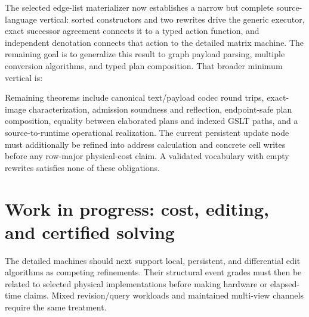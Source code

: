 \documentclass[11pt]{article}
\theoremstyle{remark}
\begin{document}
The selected edge-list materializer now establishes a narrow but complete
source-language vertical: sorted constructors and two rewrites drive the
generic executor, exact successor agreement connects it to a typed action
function, and independent denotation connects that action to the detailed
matrix machine.  The remaining goal is to generalize this result to graph
payload parsing, multiple conversion algorithms, and typed plan composition.
That broader minimum vertical is:
\begin{center}
\end{center}
Remaining theorems include canonical text/payload codec round trips,
exact-image characterization, admission soundness and reflection,
endpoint-safe plan composition, equality between elaborated plans and indexed
GSLT paths, and a source-to-runtime operational realization.  The current
persistent update node must additionally be refined into address calculation
and concrete cell writes before any row-major physical-cost claim.  A
validated vocabulary with empty rewrites satisfies none of these obligations.

\section{Work in progress: cost, editing, and certified solving}
\label{app:later}

The detailed machines should next support local, persistent, and differential
edit algorithms as competing refinements.  Their structural event grades must
then be related to selected physical implementations before making hardware
or elapsed-time claims.  Mixed revision/query workloads and maintained
multi-view channels require the same treatment.
\end{document}
